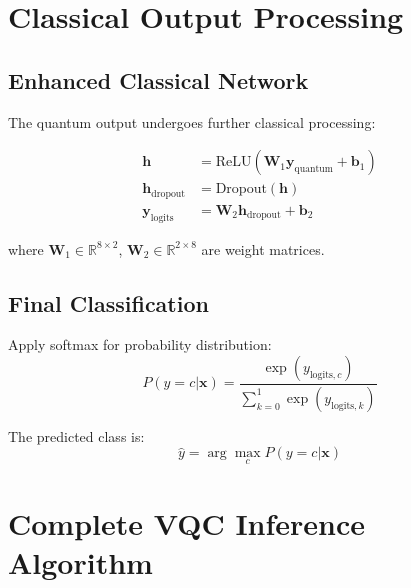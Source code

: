 \documentclass[12pt]{article}
\begin{document}
\section{Classical Output Processing}

\subsection{Enhanced Classical Network}
The quantum output undergoes further classical processing:

\begin{align}
\mathbf{h} &= \text{ReLU}(\mathbf{W}_1 \mathbf{y}_{\text{quantum}} + \mathbf{b}_1) \\
\mathbf{h}_{\text{dropout}} &= \text{Dropout}(\mathbf{h}) \\
\mathbf{y}_{\text{logits}} &= \mathbf{W}_2 \mathbf{h}_{\text{dropout}} + \mathbf{b}_2
\end{align}

where $\mathbf{W}_1 \in \mathbb{R}^{8 \times 2}$, $\mathbf{W}_2 \in \mathbb{R}^{2 \times 8}$ are weight matrices.

\subsection{Final Classification}
Apply softmax for probability distribution:
\begin{equation}
P(y = c | \mathbf{x}) = \frac{\exp(y_{\text{logits},c})}{\sum_{k=0}^{1} \exp(y_{\text{logits},k})}
\end{equation}

The predicted class is:
\begin{equation}
\hat{y} = \arg\max_c P(y = c | \mathbf{x})
\end{equation}

\section{Complete VQC Inference Algorithm}
\end{document}
